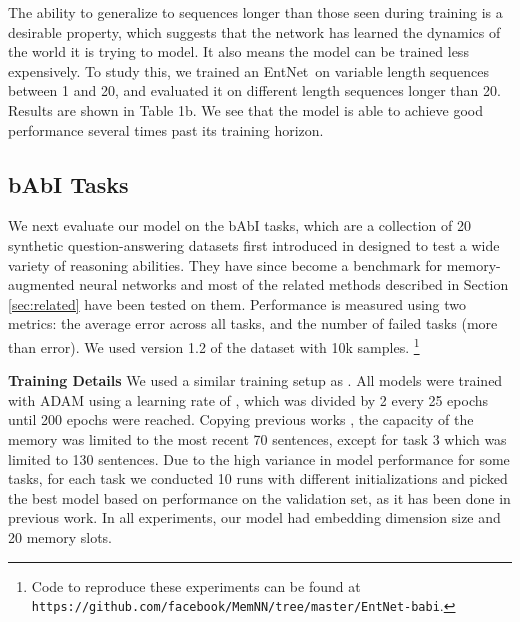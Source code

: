 \documentclass{article} \usepackage{iclr2016_conference,times}
\newcommand{\modelabbrev}{EntNet}
\begin{document}
The ability to generalize to sequences longer than those seen during training is a desirable property, which suggests that the network has learned the dynamics of the world it is trying to model. It also means the model can be trained less expensively. 
To study this, we trained an \modelabbrev~on variable length sequences between 1 and 20, and evaluated it on different length sequences longer than 20. 
Results are shown in Table 1b. We see that the model is able to achieve good performance several times past its training horizon.



\subsection{bAbI Tasks}

We next evaluate our model on the bAbI tasks, which are a collection of 20 synthetic question-answering datasets first introduced in \citep{babi} designed to test a wide variety of reasoning abilities. 
They have since become a benchmark for memory-augmented neural networks and most of the related methods
 described in Section \ref{sec:related} have been tested on them.
Performance is measured using two metrics: the average error across all tasks, and the number of failed tasks (more than  error).
We used version 1.2 of the dataset with 10k samples. 
\footnote{Code to reproduce these experiments can be found at \\ \texttt{https://github.com/facebook/MemNN/tree/master/EntNet-babi}.}




\textbf{Training Details} We used a similar training setup as \citep{MemN2N}. All models were trained with ADAM using a learning rate of , which was divided by 2 every 25 epochs until 200 epochs were reached. 
Copying previous works \citep{MemN2N,DMN}, the capacity of the memory was limited to the most recent 70 sentences, except for task 3 which was limited to 130 sentences. 
Due to the high variance in model performance for some tasks, for each task we conducted 10 runs with different initializations and picked the best model based on performance on the validation set, as it has been done in previous work. 
In all experiments, our model had embedding dimension size  and 20 memory slots. 
\end{document}
